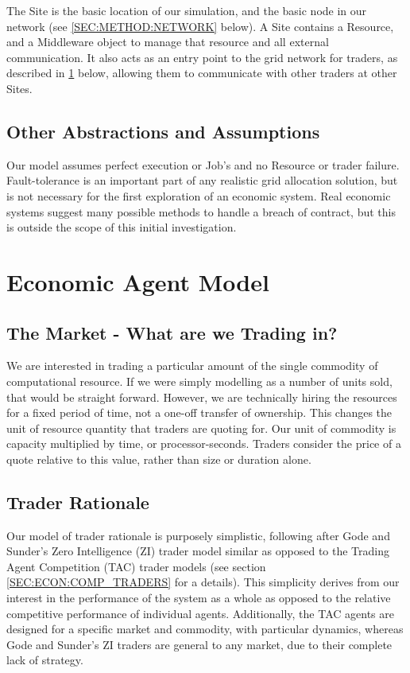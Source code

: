The Site is the basic location of our simulation, and the basic node in our
network (see \ref{SEC:METHOD:NETWORK} below). A Site contains a Resource, and a
Middleware object to manage that resource and all external communication. It
also acts as an entry point to the grid network for traders, as described in
\ref{SEC:METHOD:TRADERS} below, allowing them to communicate with other traders
at other Sites.


\subsection{Other Abstractions and Assumptions}

Our model assumes perfect execution or Job's and no Resource or trader failure.
Fault-tolerance is an important part of any realistic grid allocation solution,
but is not necessary for the first exploration of an economic system. Real
economic systems suggest many possible methods to handle a breach of contract,
but this is outside the scope of this initial investigation.


\section{Economic Agent Model}
\label{SEC:METHOD:TRADERS}

\subsection{The Market - What are we Trading in?}
\label{SEC:METHOD:COMMODITY}

We are interested in trading a particular amount of the single commodity of
computational resource. If we were simply modelling as a number of units sold,
that would be straight forward. However, we are technically hiring the
resources for a fixed period of time, not a one-off transfer of ownership. This
changes the unit of resource quantity that traders are quoting for. Our unit of
commodity is capacity multiplied by time, or processor-seconds. Traders
consider the price of a quote relative to this value, rather than size or
duration alone.


\subsection{Trader Rationale}
\label{SEC:METHOD:RATIONALE}

Our model of trader rationale is purposely simplistic, following after Gode and
Sunder's Zero Intelligence (ZI) trader model\cite{eco-gode93-zi} similar as opposed to
the Trading Agent Competition (TAC)\cite{eco-wellman99-tac} trader models (see
section \ref{SEC:ECON:COMP_TRADERS} for a details).  This simplicity derives
from our interest in the performance of the system as a whole as opposed to the
relative competitive performance of individual agents. Additionally, the TAC
agents are designed for a specific market and commodity, with particular
dynamics, whereas Gode and Sunder's ZI traders are general to any market, due
to their complete lack of strategy.

